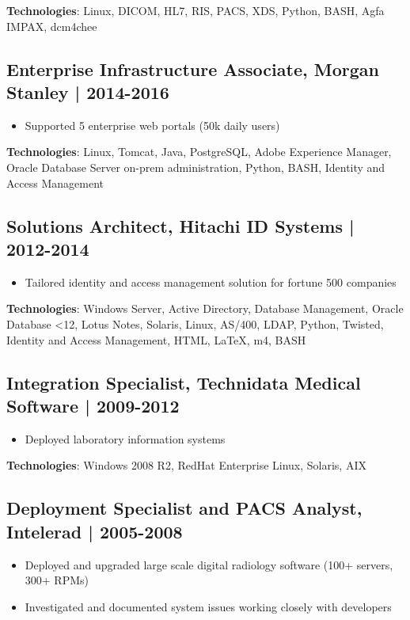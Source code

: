 \documentclass[11pt,a4paper]{article}
\begin{document}
\textbf{Technologies}: Linux, DICOM, HL7, RIS, PACS, XDS, Python, BASH, Agfa IMPAX, dcm4chee
\subsection*{Enterprise Infrastructure Associate, Morgan Stanley | 2014-2016}
\label{sec:org5ff822e}
\begin{itemize}
\item Supported 5 enterprise web portals (50k daily users)
\end{itemize}

\textbf{Technologies}: Linux, Tomcat, Java, PostgreSQL, Adobe Experience Manager, Oracle Database Server on-prem administration, Python, BASH, Identity and Access Management
\subsection*{Solutions Architect, Hitachi ID Systems | 2012-2014}
\label{sec:org02c97c6}
\begin{itemize}
\item Tailored identity and access management solution for fortune 500 companies
\end{itemize}

\textbf{Technologies}: Windows Server, Active Directory, Database Management, Oracle Database <12, Lotus Notes, Solaris, Linux, AS/400, LDAP, Python, Twisted, Identity and Access Management, HTML, \LaTeX{}, m4, BASH
\subsection*{Integration Specialist, Technidata Medical Software | 2009-2012}
\label{sec:org3fc7d15}
\begin{itemize}
\item Deployed laboratory information systems
\end{itemize}

\textbf{Technologies}: Windows 2008 R2, RedHat Enterprise Linux, Solaris, AIX
\subsection*{Deployment Specialist and PACS Analyst, Intelerad | 2005-2008}
\label{sec:org8624400}
\begin{itemize}
\item Deployed and upgraded large scale digital radiology software (100+ servers, 300+ RPMs)
\item Investigated and documented system issues working closely with developers
\end{itemize}
\end{document}
